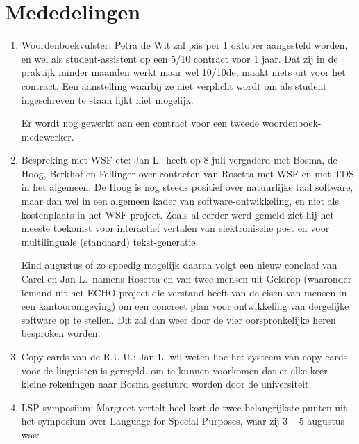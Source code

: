 \section{Mededelingen}
\begin{enumerate}
  \item Woordenboekvulster: Petra de Wit zal pas per 1 oktober aangesteld 
worden, en wel als student-assistent op een 5/10 contract voor 1 jaar. Dat zij 
in de praktijk minder maanden werkt maar wel 10/10de, 
maakt niets uit voor het contract. Een 
aanstelling waarbij ze niet verplicht wordt om als student ingeschreven te 
staan lijkt niet mogelijk. 

Er wordt nog gewerkt aan een contract voor een tweede woordenboek-medewerker.
  \item Bespreking met WSF etc: Jan L.\ heeft op 8 juli vergaderd met Bosma, de 
Hoog, Berkhof en Fellinger over contacten van Rosetta met WSF en met TDS in het 
algemeen. De Hoog is nog steeds positief over natuurlijke taal software, maar 
dan wel in een algemeen kader van software-ontwikkeling, en niet als 
kostenplaats in het WSF-project. Zoals al 
eerder werd gemeld ziet hij het meeste toekomst voor interactief vertalen van 
elektronische post en voor multilinguale (standaard) tekst-generatie. 

Eind augustus of zo spoedig mogelijk daarna volgt een nieuw conclaaf van Carel 
en Jan L.\ namens Rosetta en van twee mensen uit Geldrop (waaronder iemand uit 
het ECHO-project die verstand heeft van de eisen van mensen in een 
kantooromgeving) om een concreet plan voor ontwikkeling van dergelijke 
software op te stellen. Dit zal dan weer door de vier oorspronkelijke heren 
besproken worden.
  \item Copy-cards van de R.U.U.: Jan L. wil weten hoe het systeem van 
copy-cards voor de linguisten is geregeld, om te kunnen voorkomen 
dat er elke keer kleine rekeningen naar Bosma gestuurd worden door de 
universiteit.
  \item LSP-symposium: Margreet vertelt heel kort de twee belangrijkste punten 
uit het symposium over Language for Special Purposes, waar zij 3 -- 5 augustus 
was: 
\end{enumerate}



